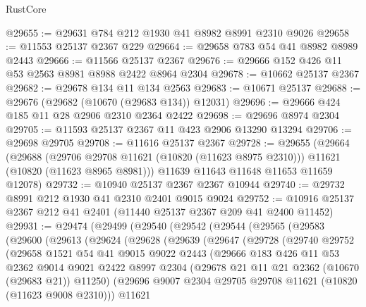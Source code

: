 \begin{lexlean}{RustCore}
\begin{coremodule}
@29655 := @29631 @784 @212 @1930 @41 @8982 @8991 @2310 @9026
@29658 := @11553 @25137 @2367 @229
@29664 := @29658 @783 @54 @41 @8982 @8989 @2443
@29666 := @11566 @25137 @2367
@29676 := @29666 @152 @426 @11 @53 @2563 @8981 @8988 @2422 @8964 @2304
@29678 := @10662 @25137 @2367
@29682 := @29678 @134 @11 @134 @2563
@29683 := @10671 @25137
@29688 := @29676 (@29682 (@10670 (@29683 @134)) @12031)
@29696 := @29666 @424 @185 @11 @28 @2906 @2310 @2364 @2422
@29698 := @29696 @8974 @2304
@29705 := @11593 @25137 @2367 @11 @423 @2906 @13290 @13294
@29706 := @29698 @29705
@29708 := @11616 @25137 @2367
@29728 := @29655
    (@29664
      (@29688
        (@29706 @29708 @11621 (@10820 (@11623 @8975 @2310)))
        @11621
        (@10820 (@11623 @8965 @8981)))
      @11639
      @11643
      @11648
      @11653
      @11659
      @12078)
@29732 := @10940 @25137 @2367 @2367 @10944
@29740 := @29732 @8991 @212 @1930 @41 @2310 @2401 @9015 @9024
@29752 := @10916 @25137 @2367 @212 @41 @2401 (@11440 @25137 @2367 @209 @41 @2400 @11452)
@29931 := @29474
    (@29499
      (@29540
        (@29542
          (@29544
            (@29565
              (@29583
                (@29600
                  (@29613
                    (@29624
                      (@29628
                        (@29639
                          (@29647
                            (@29728
                              (@29740
                                @29752
                                (@29658
                                  @1521
                                  @54
                                  @41
                                  @9015
                                  @9022
                                  @2443
                                  (@29666
                                    @183
                                    @426
                                    @11
                                    @53
                                    @2362
                                    @9014
                                    @9021
                                    @2422
                                    @8997
                                    @2304
                                    (@29678 @21 @11 @21 @2362 (@10670 (@29683 @21)) @11250)
                                    (@29696
                                      @9007
                                      @2304
                                      @29705
                                      @29708
                                      @11621
                                      (@10820 (@11623 @9008 @2310)))
                                    @11621

\end{coremodule}
\end{lexlean}
